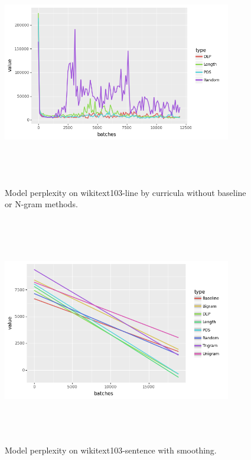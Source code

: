\documentclass [11pt, proquest] {uwthesis}[2020/12/20]
\begin{document}
\begin{figure}[h]
\centering
\label{fig:wikitext-103-sentence}
\includegraphics[width=10cm, height=10cm]{Thesis/images/wikitext-103lineminusbigrambaselinetrigramunigram.png}
\caption{Model perplexity on wikitext103-line by curricula without baseline or N-gram methods.}
\end{figure}
\begin{figure}[h]
\centering
\label{fig:wikitext-103-sentence}
\includegraphics[width=10cm, height=10cm]{Thesis/images/wikitext-103sentence.png}
\caption{Model perplexity on wikitext103-sentence with smoothing.}
\end{figure}
\end{document}
